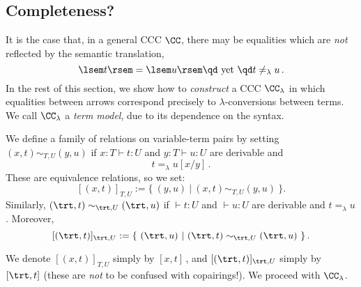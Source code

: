 \documentclass[12pt]{article}
\begin{document}
\subsection{Completeness?}
It is the case that, in a general CCC $\CC$, there may be equalities which are \emph{not} reflected by the semantic translation, \ie
\[ \lsem t \rsem = \lsem u \rsem \text{\qd yet \qd} t\neq_\lambda u\,. \]
%
In the rest of this section,
we show how to \emph{construct} a CCC $\CC_\lambda$ in which equalities between arrows correspond precisely to $\lambda$-conversions between terms.
We call $\CC_\lambda$ a \emph{term model}, due to its dependence on the syntax.

\begin{mydefinition}\label{d:EqT}
We define a family of relations on variable-term pairs by setting \hbox{$(x,t)\sim_{T,U}(y,u)$} if $x:T\vdash t:U$ and $y:T\vdash u:U$ are derivable and
\[ t=_\lambda u[x/y]\,. \]
These are equivalence relations, so we set:
\[ [(x,t)]_{T,U} := \{\ (y,u)\ |\ (x,t)\sim_{T,U}(y,u)\ \}. \]
Similarly, $(\trt,t)\sim_{\trt,U}(\trt,u)$ if $\vdash t:U$ and $\vdash u:U$ are derivable and $t=_\lambda u$. Moreover,
\[ [(\trt,t)]_{\trt,U} := \{\ (\trt,u)\ |\ (\trt,t)\sim_{\trt,U}(\trt,u)\ \}\,. \]\deq[-1]
\end{mydefinition}
We denote $[(x,t)]_{T,U}$ simply by $[x,t]$\,, and $[(\trt,t)]_{\trt,U}$ simply by $[\trt,t]$ (these are \emph{not} to be confused with copairings!). We proceed with $\CC_\lambda$.
\end{document}
